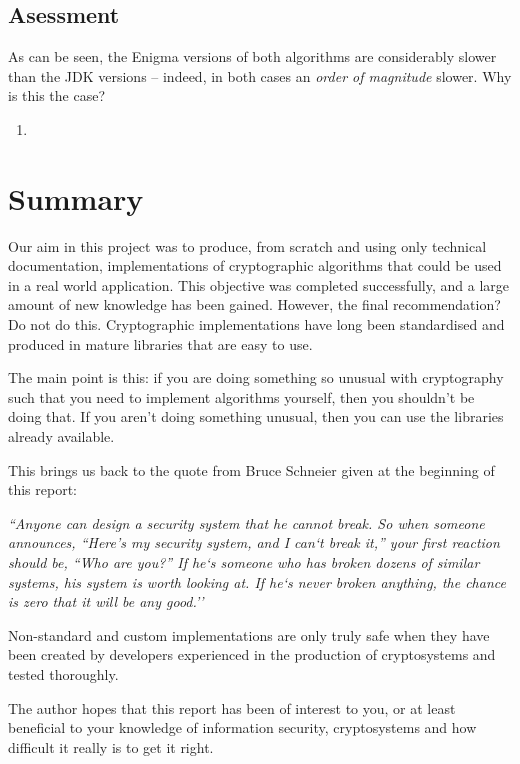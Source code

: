   \subsection{Asessment}
  
  As can be seen, the Enigma versions of both algorithms are considerably slower than the JDK versions -- indeed, in both cases an \emph{order of magnitude} slower. Why is this the case? 
  
  \begin{enumerate}
    \item 
  \end{enumerate}

\section{Summary}

Our aim in this project was to produce, from scratch and using only technical documentation, implementations of cryptographic algorithms that could be used in a real world application. This objective was completed successfully, and a large amount of new knowledge has been gained. However, the final recommendation? Do not do this. Cryptographic implementations have long been standardised and produced in mature libraries that are easy to use.

The main point is this: if you are doing something so unusual with cryptography such that you need to implement algorithms yourself, then you shouldn't be doing that. If you aren't doing something unusual, then you can use the libraries already available.

This brings us back to the quote from Bruce Schneier given at the beginning of this report: 

\textit{``Anyone can design a security system that he cannot break. So when someone announces, ``Here’s my security system, and I can`t break it,” your first reaction should be, “Who are you?” If he`s someone who has broken dozens of similar systems, his system is worth looking at. If he`s never broken anything, the chance is zero that it will be any good.''}

Non-standard and custom implementations are only truly safe when they have been created by developers experienced in the production of cryptosystems and tested thoroughly.

The author hopes that this report has been of interest to you, or at least beneficial to your knowledge of information security, cryptosystems and how difficult it really is to get it right.